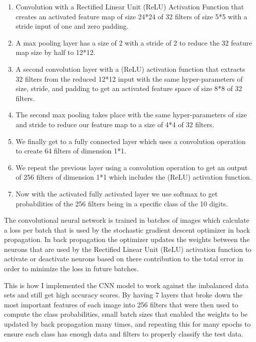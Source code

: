 \documentclass[Dealing with Imbalance in Computer Vision]{IEEEtran}
\begin{document}
\begin{enumerate}
    \item Convolution with a Rectified Linear Unit (ReLU) Activation Function that creates an activated feature map of size 24*24 of 32 filters of size 5*5 with a stride input of one and zero padding. 
    \item A max pooling layer has a size of 2 with a stride of 2 to reduce the 32 feature map size by half to 12*12.
    \item A second convolution layer with a (ReLU) activation function that extracts 32 filters from the reduced 12*12 input with the same hyper-parameters of size, stride, and padding to get an activated feature space of size 8*8 of 32 filters. 
    \item The second max pooling takes place with the same hyper-parameters of size and stride to reduce our feature map to a size of 4*4 of 32 filters.
    \item We finally get to a fully connected layer which uses a convolution operation to create 64 filters of dimension 1*1.
    \item We repeat the previous layer using a convolution operation to get an output of 256 filters of dimension 1*1 which includes the (ReLU) activation function.
    \item Now with the activated fully activated layer we use softmax to get probabilities of the 256 filters being in a specific class of the 10 digits.
\end{enumerate}

The convolutional neural network is trained in batches of images which calculate a loss per batch that is used by the stochastic gradient descent optimizer in back propagation. In back propagation the optimizer updates the weights between the neurons that are used by the Rectified Linear Unit (ReLU) activation function to activate or deactivate neurons based on there contribution to the total error in order to minimize the loss in future batches.  

This is how I implemented the CNN model to work against the imbalanced data sets and still get high accuracy scores. By having 7 layers that broke down the most important features of each image into 256 filters that were then used to compute the class probabilities, small batch sizes that enabled the weights to be updated by back propagation many times, and repeating this for many epochs to ensure each class has enough data and filters to properly classify the test data.
\end{document}
